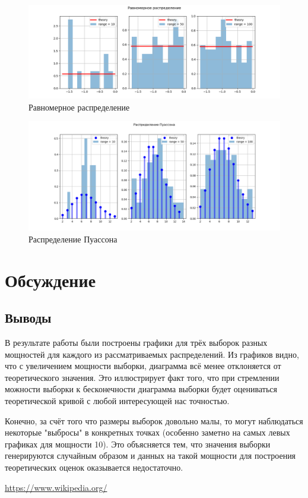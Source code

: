 \documentclass[12pt]{article}
\begin{document}
\begin{figure}[h!]
\begin{center}
\includegraphics[width=\textwidth]{uniform.png}
\caption{Равномерное распределение}
\end{center}
\end{figure}

\pagebreak

\begin{figure}[h!]
\begin{center}
\includegraphics[width=\textwidth]{poisson.png}
\caption{Распределение Пуассона}
\end{center}
\end{figure}

\section{Обсуждение}

\subsection{Выводы}
В результате работы были построены графики для трёх выборок разных мощностей для каждого из рассматриваемых распределений. Из графиков видно, что с увеличением мощности выборки, диаграмма всё менее отклоняется от теоретического значения. Это иллюстрирует факт того, что при стремлении можности выборки к бесконечности диаграмма выборки будет оцениваться теоретической кривой с любой интересующей нас точностью.
\par
Конечно, за счёт того что размеры выборок довольно малы, то могут наблюдаться некоторые "выбросы" в конкретных точках (особенно заметно на самых левых графиках для мощности 10). Это объясняется тем, что значения выборки генерируются случайным образом и данных на такой мощности для построения теоретических оценок оказывается недостаточно.

 
\begin{thebibliography}{}
     \url{https://www.wikipedia.org/}
\end{thebibliography}
\end{document}
